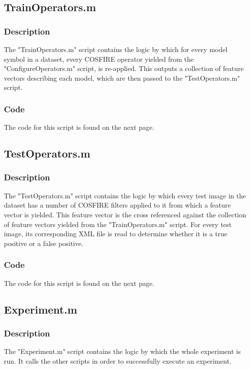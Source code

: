 \subsection{TrainOperators.m}
\subsubsection{Description}
The "TrainOperators.m" script contains the logic by which for every model symbol in a dataset, every COSFIRE operator yielded from the "ConfigureOperators.m" script, is re-applied. This outputs a collection of feature vectors describing each model, which are then passed to the "TestOperators.m" script.
\subsubsection{Code}
The code for this script is found on the next page.
\vspace{133.3mm}

\subsection{TestOperators.m}
\subsubsection{Description}
The "TestOperators.m" script contains the logic by which every test image in the dataset has a number of COSFIRE filters applied to it from which a feature vector is yielded. This feature vector is the cross referenced against the collection of feature vectors yielded from the "TrainOperators.m" script. For every test image, its corresponding XML file is read to determine whether it is a true positive or a false positive.

\subsubsection{Code}
The code for this script is found on the next page.
\vspace{133.3mm}


\subsection{Experiment.m}
\subsubsection{Description}
The "Experiment.m" script contains the logic by which the whole experiment is run. It calls the other scripts in order to successfully execute an experiment.

